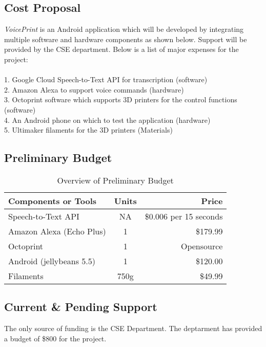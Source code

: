 \subsection{Cost Proposal}
\textit{VoicePrint} is an Android application which will be developed by integrating multiple software and hardware components as shown below. Support will be provided by the CSE department. Below is a list of major expenses for the project:
\\
\\
1. Google Cloud Speech-to-Text API for transcription (software)
\\
2. Amazon Alexa to support voice commands (hardware)
\\
3. Octoprint software which supports 3D printers for the control functions (software)
\\
4. An Android phone on which to test the application (hardware)
\\
5. Ultimaker filaments for the 3D printers (Materials) \\

\subsection{Preliminary Budget}
\begin{table}
    \centering
    \begin{tabular}{|l|c|r|}
    	\hline
        \textbf{Components or Tools} & \textbf{Units} & \textbf{Price} \\
        \hline
	    Speech-to-Text API & NA & \$0.006 per 15 seconds\\
	    \hline
	    Amazon Alexa (Echo Plus) & 1 & \$179.99\\
	    \hline
    	Octoprint & 1 & Opensource\\
    	\hline
	    Android (jellybeans 5.5) & 1 & \$120.00\\
	    \hline
	    Filaments & 750g & \$49.99\\
	    \hline
    \end{tabular}
    \caption{Overview of Preliminary Budget}
\end{table}

\subsection{Current \& Pending Support}
The only source of funding is the CSE Department. The deptarment has provided a budget of \$800 for the project. \\